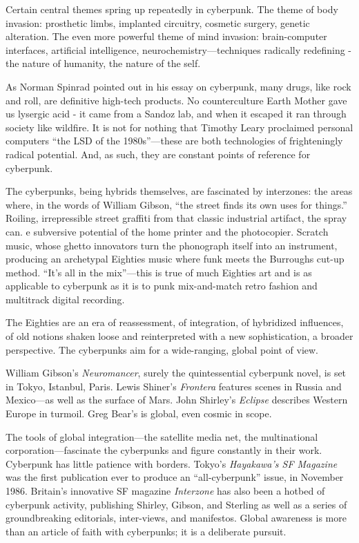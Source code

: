 Certain central themes spring up repeatedly in cyberpunk. The theme of body invasion: prosthetic limbs, implanted circuitry, cosmetic surgery, genetic alteration. The even more powerful theme of mind invasion: brain-computer interfaces, artificial intelligence, neurochemistry---techniques radically redefining - the nature of humanity, the nature of the self.

As Norman Spinrad pointed out in his essay on cyberpunk, many drugs, like rock and roll, are definitive high-tech products. No counterculture Earth Mother gave us lysergic acid - it came from a Sandoz lab, and when it escaped it ran through society like wildfire. It is not for nothing that Timothy Leary proclaimed personal computers ``the LSD of the 1980s''---these are both technologies of frighteningly radical potential. And, as such, they are constant points of reference for cyberpunk.

The cyberpunks, being hybrids themselves, are fascinated by interzones: the areas where, in the words of William Gibson, ``the street finds its own uses for things.'' Roiling, irrepressible street graffiti from that classic industrial artifact, the spray can. e subversive potential of the home printer and the photocopier. Scratch music, whose ghetto innovators turn the phonograph itself into an instrument, producing an archetypal Eighties music where funk meets the Burroughs cut-up method. ``It's all in the mix''---this is true of much Eighties art and is as applicable to cyberpunk as it is to punk mix-and-match retro fashion and multitrack digital recording.

The Eighties are an era of reassessment, of integration, of hybridized influences, of old notions shaken loose and reinterpreted with a new sophistication, a broader perspective. The cyberpunks aim for a wide-ranging, global point of view.

William Gibson's \textit{Neuromancer}, surely the quintessential cyberpunk novel, is set in Tokyo, Istanbul, Paris. Lewis Shiner's \textit{Frontera} features scenes in Russia and Mexico---as well as the surface of Mars. John Shirley's \textit{Eclipse} describes Western Europe in turmoil. Greg Bear's  is global, even cosmic in scope.

The tools of global integration---the satellite media net, the multinational corporation---fascinate the cyberpunks and figure constantly in their work. Cyberpunk has little patience with borders. Tokyo's \textit{Hayakawa's SF Magazine} was the first publication ever to produce an ``all-cyberpunk'' issue, in November 1986. Britain's innovative SF magazine \textit{Interzone} has also been a hotbed of cyberpunk activity, publishing Shirley, Gibson, and Sterling as well as a series of groundbreaking editorials, inter-views, and manifestos. Global awareness is more than an article of faith with cyberpunks; it is a deliberate pursuit.

